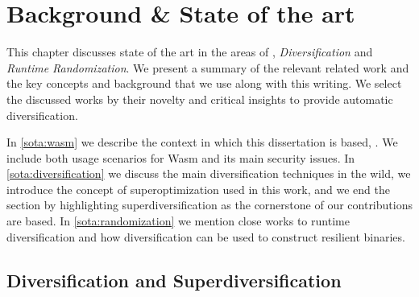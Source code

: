 \chapter{Background \& State of the art}

This chapter discusses state of the art in the areas of \emph{\wasm}, \emph{Diversification} and \emph{Runtime Randomization}. We present a summary of the relevant related work and the key concepts and background that we use along with this writing. 
We select the discussed works by their novelty and critical insights to provide automatic diversification. 

In \autoref{sota:wasm} we describe the context in which this dissertation is based, \wasm. We include both usage scenarios for Wasm and its main security issues. In \autoref{sota:diversification} we discuss the main diversification techniques in the wild, we introduce the concept of superoptimization used in this work, and we end the section by highlighting superdiversification as the cornerstone of our contributions are based. In \autoref{sota:randomization} we mention close works to runtime diversification and how diversification can be used to construct resilient binaries. 









\section{Diversification and Superdiversification}
\label{sota:diversification}





